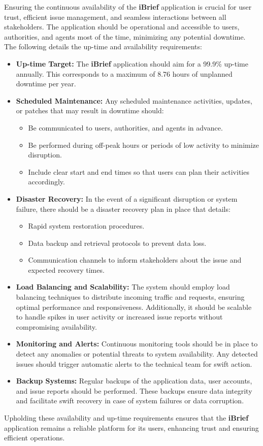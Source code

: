 Ensuring the continuous availability of the \textbf{iBrief} application is crucial for user trust, efficient issue management, and seamless interactions between all stakeholders. The application should be operational and accessible to users, authorities, and agents most of the time, minimizing any potential downtime. The following details the up-time and availability requirements:

\begin{itemize}
    \item \textbf{Up-time Target:} 
    The \textbf{iBrief} application should aim for a 99.9\% up-time annually. This corresponds to a maximum of 8.76 hours of unplanned downtime per year.

    \item \textbf{Scheduled Maintenance:} 
    Any scheduled maintenance activities, updates, or patches that may result in downtime should:
    \begin{itemize}
        \item Be communicated to users, authorities, and agents in advance.
        \item Be performed during off-peak hours or periods of low activity to minimize disruption.
        \item Include clear start and end times so that users can plan their activities accordingly.
    \end{itemize}
    
    \item \textbf{Disaster Recovery:}
    In the event of a significant disruption or system failure, there should be a disaster recovery plan in place that details:
    \begin{itemize}
        \item Rapid system restoration procedures.
        \item Data backup and retrieval protocols to prevent data loss.
        \item Communication channels to inform stakeholders about the issue and expected recovery times.
    \end{itemize}
    
    \item \textbf{Load Balancing and Scalability:}
    The system should employ load balancing techniques to distribute incoming traffic and requests, ensuring optimal performance and responsiveness. Additionally, it should be scalable to handle spikes in user activity or increased issue reports without compromising availability.
    
    \item \textbf{Monitoring and Alerts:}
    Continuous monitoring tools should be in place to detect any anomalies or potential threats to system availability. Any detected issues should trigger automatic alerts to the technical team for swift action.

    \item \textbf{Backup Systems:}
    Regular backups of the application data, user accounts, and issue reports should be performed. These backups ensure data integrity and facilitate swift recovery in case of system failures or data corruption.

\end{itemize}

Upholding these availability and up-time requirements ensures that the \textbf{iBrief} application remains a reliable platform for its users, enhancing trust and ensuring efficient operations.
